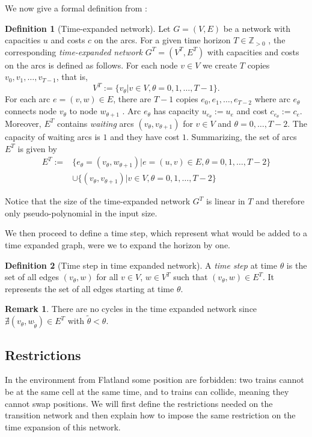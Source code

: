 \documentclass[14pt,a4paper]{article}
\theoremstyle{definition}
\newtheorem{madef}{Definition}[section]
\newtheorem*{remark}{Remark}
\numberwithin{equation}{subsection}
\begin{document}
We now give a formal definition from \cite[p.~19]{Skutella2008AnIT}:
\begin{madef}[Time-expanded network]
	 Let $G = (V, E)$ be a network with capacities $u$ and costs $c$ on the arcs. For a given time horizon $T\in \mathds{Z}_{>0}$ ,	the corresponding \emph{time-expanded network} $G^T = (V^T, E^T)$ with capacities and costs on the arcs
	is defined as follows. For each node $v\in V$ we create $T$ copies $v_0 , v_1 , \ldots, v_{T-1} $, that is,
	$$V^T := \{v_\theta | v \in V, \theta = 0, 1, \ldots, T-1\}.$$
	For each arc $e = (v, w) \in E$, there are $T-1$  copies $e_0,e_1,\ldots,e_{T-2}$ where arc $e_\theta$ connects
	node $v_\theta$ to node $w_{\theta+1}$ . Arc $e_\theta$ has capacity $u_{e_{\theta}}:= u_{e}$ and cost $c_{e_{\theta}}:= c_{e}$. Moreover, $E^T$ contains
	\emph{waiting} arcs $(v_\theta , v _{\theta+1})$ for $v \in V$ and $\theta = 0,\ldots, T-2$. The capacity of waiting arcs is $1$
	and they have cost $1$. Summarizing, the set of arcs $E^T$ is given by
	\begin{align*}
	 E^T := &\{e_\theta = (v_\theta,w_{\theta+1})| e = (u,v) \in E, \theta=0,1,\ldots,T-2 \} \\
	 &\cup \{(v_\theta,v_{\theta+1})|v\in V, \theta=0,1,\ldots,T-2 \}
	 \end{align*}
\end{madef}

Notice that the size of the	time-expanded network $G^T$ is linear in $T$ and therefore only pseudo-polynomial in the input size.




We then proceed to define a time step, which represent what would be added to a time expanded graph, were we to expand the horizon by one.

\begin{madef}[Time step in time expanded network]	
	A \emph{time step} at time $\theta$ is the set of all edges $(v_\theta,w)$ for all $v \in V$, $w \in V^T$ such that $(v_\theta,w) \in E^T$. 
	It represents the set of all edges starting at time $\theta$.
\end{madef}


\begin{remark}
	There are no cycles in the time expanded network since $\nexists (v_\theta,w_{\tilde{\theta}}) \in E^T$ with $\tilde{\theta} < \theta$.
\end{remark}
	
\subsection{Restrictions}
\label{sec:restrictions}
In the environment from Flatland some position are forbidden: two trains cannot be at the same cell at the same time, and to trains can collide, meaning they cannot swap positions.  We will first define the restrictions needed on the transition network and then explain how to impose the same restriction on the time expansion of this network.
\end{document}
